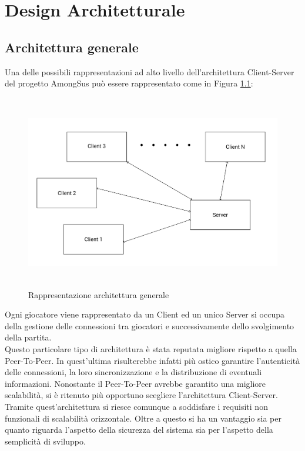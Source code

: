 \chapter{Design Architetturale}

\section{Architettura generale}

Una delle possibili rappresentazioni ad alto livello dell'architettura Client-Server del progetto AmongSus pu\`o essere rappresentato come in Figura \ref{fig:RapArcGen}:

\begin{figure}[ht]
\centering
\includegraphics[width=12cm, height=8.5cm]{doc/report/img/ArchitetturaGenerale.png}
\caption{Rappresentazione architettura generale}
\label{fig:RapArcGen}
\end{figure}

Ogni giocatore viene rappresentato da un Client ed un unico Server si occupa della gestione delle connessioni tra giocatori e successivamente dello svolgimento della partita.\\
Questo particolare tipo di architettura \`e stata reputata migliore rispetto a quella Peer-To-Peer. In quest'ultima risulterebbe infatti pi\`u ostico garantire l'autenticit\`a delle connessioni, la loro sincronizzazione e la distribuzione di eventuali informazioni. Nonostante il Peer-To-Peer avrebbe garantito una migliore scalabilit\`a,  si \`e ritenuto più opportuno scegliere l'architettura Client-Server.\\
Tramite quest'architettura si riesce comunque a soddisfare i requisiti non funzionali di scalabilit\`a orizzontale. Oltre a questo si ha un vantaggio sia per quanto riguarda l'aspetto della sicurezza del sistema sia per l'aspetto della semplicit\`a di sviluppo.\\

